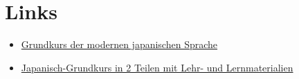 \documentclass[justified, a4paper, notitlepage, captions=tableheading, nobib]{tufte-handout}
\begin{document}
\newpage
\section{Links}
\label{sec:org7b16bc9}

\begin{itemize}
\item \href{https://www-user.tu-chemnitz.de/\~heha/j/buchtext/Index.htm}{Grundkurs der modernen japanischen Sprache}
\item \href{https://omp.ub.rub.de/index.php/RUB/catalog/book/31}{Japanisch-Grundkurs in 2 Teilen mit Lehr- und Lernmaterialien}
\end{itemize}

\newpage

\nocite{*}
\printbibliography
{}
\end{document}

